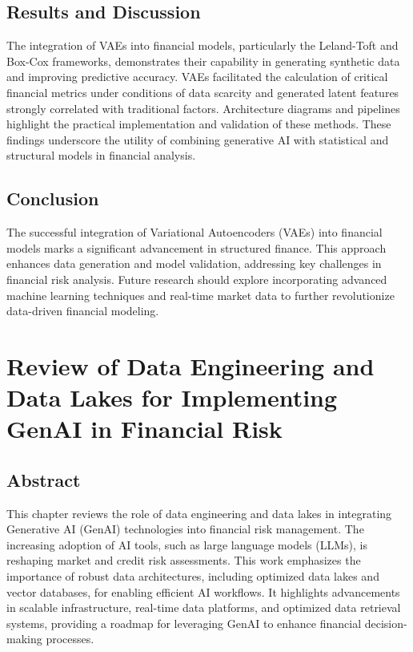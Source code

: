 \documentclass[a4paper,headinclude=on,footinclude=on,12pt,oneside]{scrbook}
\begin{document}
\section{Results and Discussion}
The integration of VAEs into financial models, particularly the Leland-Toft and Box-Cox frameworks, demonstrates their capability in generating synthetic data and improving predictive accuracy. VAEs facilitated the calculation of critical financial metrics under conditions of data scarcity and generated latent features strongly correlated with traditional factors. Architecture diagrams and pipelines highlight the practical implementation and validation of these methods. These findings underscore the utility of combining generative AI with statistical and structural models in financial analysis.

\section{Conclusion}
The successful integration of Variational Autoencoders (VAEs) into financial models marks a significant advancement in structured finance. This approach enhances data generation and model validation, addressing key challenges in financial risk analysis. Future research should explore incorporating advanced machine learning techniques and real-time market data to further revolutionize data-driven financial modeling.

\chapter{Review of Data Engineering and Data Lakes for Implementing GenAI in Financial Risk}

\section*{Abstract}
This chapter reviews the role of data engineering and data lakes in integrating Generative AI (GenAI) technologies into financial risk management. The increasing adoption of AI tools, such as large language models (LLMs), is reshaping market and credit risk assessments. This work emphasizes the importance of robust data architectures, including optimized data lakes and vector databases, for enabling efficient AI workflows. It highlights advancements in scalable infrastructure, real-time data platforms, and optimized data retrieval systems, providing a roadmap for leveraging GenAI to enhance financial decision-making processes.
\end{document}
